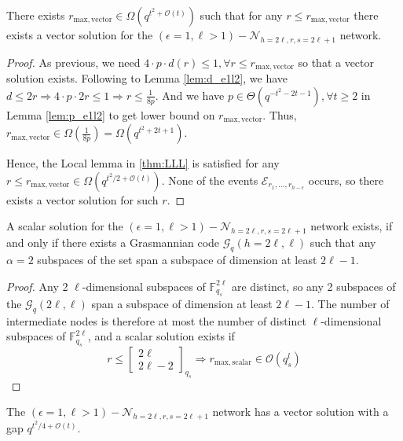 \begin{thm}
There exists $r_{\mathrm{max,vector}}\in\Omega\left(q^{t^{2}+\mathcal{O}\left(t\right)}\right)$
such that for any $r\leq r_{\mathrm{max,vector}}$ there exists a
vector solution for the $\left(\epsilon=1,\ell>1\right)-\mathcal{N}_{h=2\ell,r,s=2\ell+1}$
network. \label{theo:r_for_e1l2}
\end{thm}
\begin{proof}
As previous, we need $4\cdot p\cdot d(r)\leq1,\forall r\leq r_{\mathrm{max,vector}}$
so that a vector solution exists. Following to Lemma \ref{lem:d_e1l2},
we have $d\leq2r\Rightarrow4\cdot p\cdot2r\leq1\Rightarrow r\leq\frac{1}{8p}$.
And we have $p\in\Theta\left(q^{-t^{2}-2t-1}\right),\forall t\geq2$
in Lemma \ref{lem:p_e1l2} to get lower bound on $r_{\mathrm{max,vector}}$.
Thus, $r_{\mathrm{max,vector}}\in\Omega\left(\frac{1}{8p}\right)=\Omega\left(q^{t^{2}+2t+1}\right)$.

Hence, the Local lemma in \ref{thm:LLL} is satisfied for any $r\leq r_{\mathrm{max,vector}}\in\Omega\left(q^{t^{2}/2+\mathcal{O}\left(t\right)}\right)$.
None of the events $\mathcal{E}_{r_{1},\ldots,r_{h-\epsilon}}$ occurs,
so there exists a vector solution for such $r$.
\end{proof}
\begin{lem}
A scalar solution for the $\left(\epsilon=1,\ell>1\right)-\mathcal{N}_{h=2\ell,r,s=2\ell+1}$
network exists, if and only if there exists a Grasmannian code $\mathcal{G}_{q}\left(h=2\ell,\ell\right)$
such that any $\alpha=2$ subspaces of the set span a subspace of
dimension at least $2\ell-1$. 
\end{lem}
\begin{proof}
Any 2 $\ell$-dimensional subspaces of $\ensuremath{\mathbb{F}}_{q_{s}}^{2\ell}$
are distinct, so any 2 subspaces of the $\mathcal{G}_{q}\left(2\ell,\ell\right)$
span a subspace of dimension at least $2\ell-1$. The number of intermediate
nodes is therefore at most the number of distinct $\ell$-dimensional
subspaces of $\ensuremath{\mathbb{F}}_{q_{s}}^{2\ell}$, and a scalar
solution exists if
\[
r\leq\left[\begin{array}{c}
2\ell\\
2\ell-2
\end{array}\right]_{q_{s}}\Rightarrow r_{\mathrm{max,scalar}}\in\mathcal{O}\left(q_{s}^{l}\right)
\]
\end{proof}
\begin{cor}
The $\left(\epsilon=1,\ell>1\right)-\mathcal{N}_{h=2\ell,r,s=2\ell+1}$
network has a vector solution with a gap $q^{t^{2}/4+\mathcal{O}(t)}$.
\label{cor:gap_e1l2}
\end{cor}
